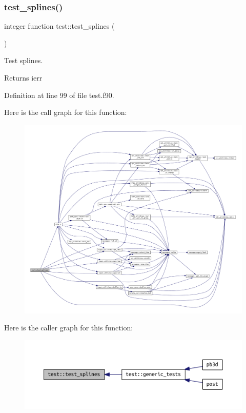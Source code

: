 \subsubsection{\texorpdfstring{test\+\_\+splines()}{test\_splines()}}
{\footnotesize\ttfamily integer function test\+::test\+\_\+splines (\begin{DoxyParamCaption}{ }\end{DoxyParamCaption})}



Test splines. 

\begin{DoxyReturn}{Returns}
ierr 
\end{DoxyReturn}


Definition at line 99 of file test.\+f90.

Here is the call graph for this function\+:\nopagebreak
\begin{figure}[H]
\begin{center}
\leavevmode
\includegraphics[width=350pt]{namespacetest_a53c6b3d654d4577af301fe3b04473d6a_cgraph}
\end{center}
\end{figure}
Here is the caller graph for this function\+:\nopagebreak
\begin{figure}[H]
\begin{center}
\leavevmode
\includegraphics[width=350pt]{namespacetest_a53c6b3d654d4577af301fe3b04473d6a_icgraph}
\end{center}
\end{figure}
\mbox{\label{namespacetest_ab595ec935321ea0b1168593fb88fad22}} 
